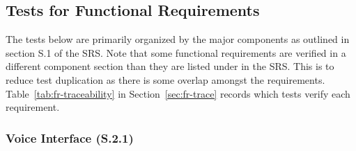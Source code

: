 \documentclass[12pt, titlepage]{article}
\begin{document}
\subsection{Tests for Functional Requirements}
The tests below are primarily organized by the major components as outlined in section S.1 of the SRS. 
Note that some functional requirements are verified in a different component section than they are listed under in the SRS.
This is to reduce test duplication as there is some overlap amongst the requirements.
Table~\ref{tab:fr-traceability} in Section~\ref{sec:fr-trace} records which tests verify each requirement.


\subsubsection{Voice Interface (S.2.1)}
\end{document}
